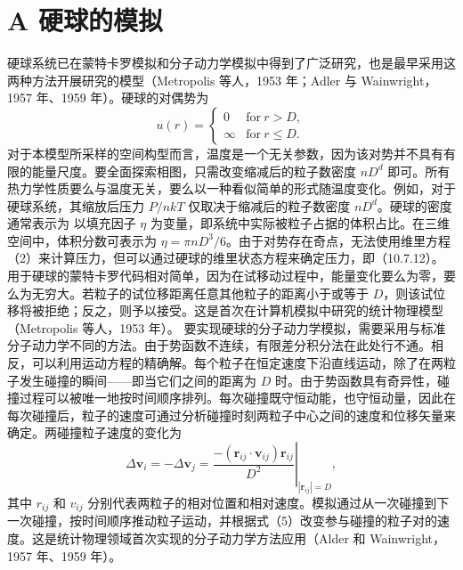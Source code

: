 \section{A 硬球的模拟}\label{a-ux786cux7403ux7684ux6a21ux62df}
硬球系统已在蒙特卡罗模拟和分子动力学模拟中得到了广泛研究，也是最早采用这两种方法开展研究的模型（Metropolis 等人，1953 年；Adler 与 Wainwright，1957 年、1959 年）。硬球的对偶势为
\begin{equation}\tag{16.4.4}\label{eq:16.4.4}
u ( r ) = \left\{ \begin{array}{ll} { 0 } & { \mathrm { f o r } \ r > D , } \\{ \infty } & { \mathrm { f o r } \ r \leq D . } \end{array} \right.
\end{equation}
对于本模型所采样的空间构型而言，温度是一个无关参数，因为该对势并不具有有限的能量尺度。要全面探索相图，只需改变缩减后的粒子数密度 \(nD^{d}\) 即可。所有热力学性质要么与温度无关，要么以一种看似简单的形式随温度变化。例如，对于硬球系统，其缩放后压力 \(P/nkT\) 仅取决于缩减后的粒子数密度 \(nD^{d}\)。硬球的密度通常表示为
以填充因子 \(\eta\) 为变量，即系统中实际被粒子占据的体积占比。在三维空间中，体积分数可表示为 \(\eta=\pi nD^{3}/6\)。由于对势存在奇点，无法使用维里方程（2）来计算压力，但可以通过硬球的维里状态方程来确定压力，即（10.7.12）。
用于硬球的蒙特卡罗代码相对简单，因为在试移动过程中，能量变化要么为零，要么为无穷大。若粒子的试位移距离任意其他粒子的距离小于或等于 \(D\)，则该试位移将被拒绝；反之，则予以接受。这是首次在计算机模拟中研究的统计物理模型（Metropolis 等人，1953 年）。
要实现硬球的分子动力学模拟，需要采用与标准分子动力学不同的方法。由于势函数不连续，有限差分积分法在此处行不通。相反，可以利用运动方程的精确解。每个粒子在恒定速度下沿直线运动，除了在两粒子发生碰撞的瞬间——即当它们之间的距离为 \(D\) 时。由于势函数具有奇异性，碰撞过程可以被唯一地按时间顺序排列。每次碰撞既守恒动能，也守恒动量，因此在每次碰撞后，粒子的速度可通过分析碰撞时刻两粒子中心之间的速度和位移矢量来确定。两碰撞粒子速度的变化为
\begin{equation}\tag{16.4.5}\label{eq:16.4.5}
\Delta \pmb { v } _ { i } = - \left. \Delta \pmb { v } _ { j } = \frac { - \left( \pmb { r } _ { i j } \cdot \pmb { v } _ { i j } \right) \pmb { r } _ { i j } } { D ^{2} } \right| _ { | \pmb { r } _ { i j } | = D } ,
\end{equation}
其中 \(r_{ij}\) 和 \(v_{ij}\) 分别代表两粒子的相对位置和相对速度。模拟通过从一次碰撞到下一次碰撞，按时间顺序推动粒子运动，并根据式（5）改变参与碰撞的粒子对的速度。这是统计物理领域首次实现的分子动力学方法应用（Alder 和 Wainwright，1957 年、1959 年）。
